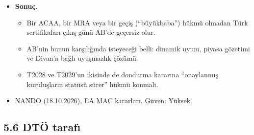 \begin{itemize}
  \begin{itemize}
  \tightlist
  \item
    İngiltere: onaylanmış kuruluşlar 2020 sonunda AB statüsünü kaybetti.
  \item
    İsviçre: MRA'nın tıbbi cihaz bölümü güncellenmediği için 2021'de sertifikalar geçersiz kaldı.
  \end{itemize}
\item
  \textbf{Sonuç.}

  \begin{itemize}
  \tightlist
  \item
    Bir ACAA, bir MRA veya bir geçiş (``büyükbaba'') hükmü olmadan Türk sertifikaları çıkış günü AB'de geçersiz olur.
  \item
    AB'nin bunun karşılığında isteyeceği belli: dinamik uyum, piyasa gözetimi ve Divan'a bağlı uyuşmazlık çözümü.
  \item
    T2028 ve T2029'un ikisinde de dondurma kararına ``onaylanmış kuruluşların statüsü sürer'' hükmü konmalı.
  \end{itemize}
\item
  \etiketV{} NANDO (18.10.2026), EA MAC kararları. Güven: Yüksek.
\end{itemize}

\hypertarget{02b_secenekler_hukuk-56-dtuxf6-tarafux131}{%
\subsection{5.6 DTÖ tarafı}\label{02b_secenekler_hukuk-56-dtuxf6-tarafux131}}

\begingroup\gbtablo\small

